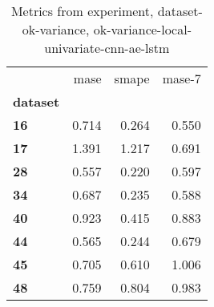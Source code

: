 \begin{table}[h]
\centering
\caption{Metrics from experiment, dataset-ok-variance, ok-variance-local-univariate-cnn-ae-lstm}
\label{table:ok-variance-local-univariate-cnn-ae-lstm-dataset-ok-variance}
\begin{tabular}{lrrr}
\toprule
{} &   mase &  smape &  mase-7 \\
\textbf{dataset} &        &        &         \\
\midrule
\textbf{16     } &  0.714 &  0.264 &   0.550 \\
\textbf{17     } &  1.391 &  1.217 &   0.691 \\
\textbf{28     } &  0.557 &  0.220 &   0.597 \\
\textbf{34     } &  0.687 &  0.235 &   0.588 \\
\textbf{40     } &  0.923 &  0.415 &   0.883 \\
\textbf{44     } &  0.565 &  0.244 &   0.679 \\
\textbf{45     } &  0.705 &  0.610 &   1.006 \\
\textbf{48     } &  0.759 &  0.804 &   0.983 \\
\bottomrule
\end{tabular}
\end{table}
